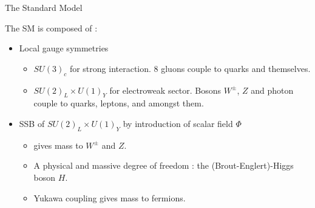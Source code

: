 \begin{frame}{The Standard Model}
  
  The SM is composed of :
  
  \begin{itemize}
  \item Local gauge symmetries
    \begin{itemize}
    \item $SU(3)_c$ for strong interaction. 8 gluons couple to quarks and themselves.
    \item $SU(2)_L\times U(1)_Y$ for electroweak sector. Bosons $W^\pm$, $Z$ and photon couple to quarks, leptons, and amongst them.
    \end{itemize}
    \vfill
  \item SSB of $SU(2)_L\times U(1)_Y$ by introduction of scalar field $\Phi$
    \begin{itemize}
    \item gives mass to $W^\pm$ and $Z$.
    \item A physical and massive degree of freedom : the (Brout-Englert)-Higgs boson $H$.
    \item Yukawa coupling gives mass to fermions.
    \end{itemize}
  \end{itemize}
\end{frame}
